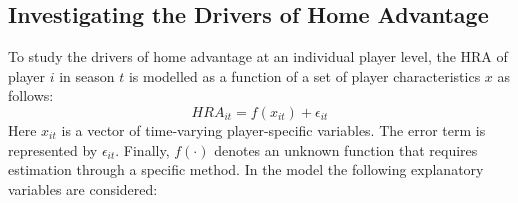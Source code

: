 \subsection{Investigating the Drivers of Home Advantage}
\label{subsec:drivers_of_home_advantage_methodology}
To study the drivers of home advantage at an individual player level, the HRA of player $i$ in season $t$ is modelled as a function of a set of player characteristics $x$ as follows:
\begin{equation}
    \label{eq:general_hra_model}
    HRA_{it} = f(x_{it}) + \epsilon_{it}
\end{equation}
\noindent
Here $x_{it}$ is a vector of time-varying player-specific variables. The error term is represented by $\epsilon_{it}$. Finally, $f(\cdot)$ denotes an unknown function that requires estimation through a specific method. In the model the following explanatory variables are considered:

